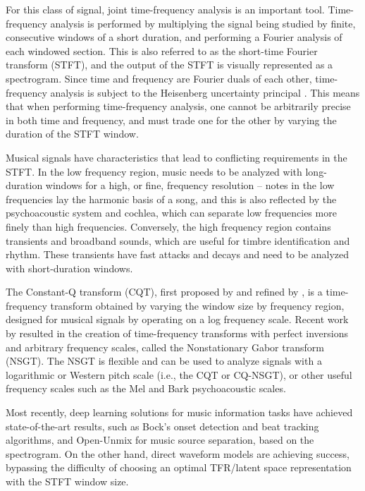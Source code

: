 \documentclass[letter,12pt,notitlepage]{article}
\begin{document}
For this class of signal, joint time-frequency analysis is an important tool. Time-frequency analysis is performed by multiplying the signal being studied by finite, consecutive windows of a short duration, and performing a Fourier analysis of each windowed section. This is also referred to as the short-time Fourier transform (STFT), and the output of the STFT is visually represented as a spectrogram. Since time and frequency are Fourier duals of each other, time-frequency analysis is subject to the Heisenberg uncertainty principal . This means that when performing time-frequency analysis, one cannot be arbitrarily precise in both time and frequency, and must trade one for the other by varying the duration of the STFT window.

Musical signals have characteristics that lead to conflicting requirements in the STFT. In the low frequency region, music needs to be analyzed with long-duration windows for a high, or fine, frequency resolution -- notes in the low frequencies lay the harmonic basis of a song, and this is also reflected by the psychoacoustic system and cochlea, which can separate low frequencies more finely than high frequencies. Conversely, the high frequency region contains transients and broadband sounds, which are useful for timbre identification and rhythm. These transients have fast attacks and decays and need to be analyzed with short-duration windows.

The Constant-Q transform (CQT), first proposed by \textcite{jbrown} and refined by \textcite{klapuricqt}, is a time-frequency transform obtained by varying the window size by frequency region, designed for musical signals by operating on a log frequency scale. Recent work by \textcite{balazs} resulted in the creation of time-frequency transforms with perfect inversions and arbitrary frequency scales, called the Nonstationary Gabor transform (NSGT). The NSGT is flexible and can be used to analyze signals with a logarithmic or Western pitch scale (i.e., the CQT or CQ-NSGT), or other useful frequency scales such as the Mel and Bark psychoacoustic scales.

Most recently, deep learning solutions for music information tasks have achieved state-of-the-art results, such as Bock's onset detection and beat tracking algorithms, and Open-Unmix for music source separation, based on the spectrogram. On the other hand, direct waveform models are achieving success, bypassing the difficulty of choosing an optimal TFR/latent space representation with the STFT window size.
\end{document}
